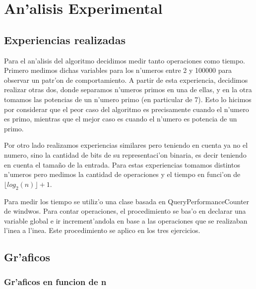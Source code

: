 \section{An'alisis Experimental}
\subsection{Experiencias realizadas}
Para el an'alisis del algoritmo decidimos medir tanto operaciones como tiempo. Primero medimos dichas variables 
para los n'umeros entre 2 y 100000 para observar un patr'on de comportamiento. A partir de esta experiencia, 
decidimos realizar otras dos, donde separamos n'umeros primos en una de ellas, y en la otra tomamos las potencias 
de un n'umero primo (en particular de 7). Esto lo hicimos por considerar que el peor caso del algoritmo es 
precisamente cuando el n'umero es primo, mientras que el mejor caso es cuando el n'umero es potencia de un primo. 

Por otro lado realizamos experiencias similares pero teniendo en cuenta ya no el numero, sino la cantidad de bits 
de su representaci'on binaria, es decir teniendo en cuenta el tama\~{n}o de la entrada. Para estas experiencias 
tomamos distintos n'umeros pero medimos la cantidad de operaciones y el tiempo en funci'on de $\lfloor log_2(n) \rfloor + 1$.

Para medir los tiempo se utiliz'o una clase basada en QueryPerformanceCounter de windwos. Para contar operaciones, el procedimiento se bas'o en declarar una variable global e ir increment'andola en base a las operaciones que se realizaban l'inea a l'inea. Este procedimiento se aplico en los tres ejercicios.

\subsection{Gr'aficos}
\subsubsection{Gr'aficos en funcion de n}

